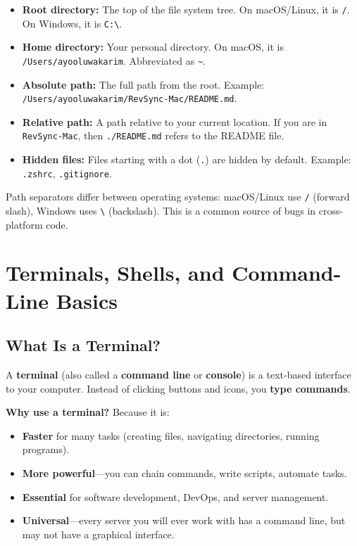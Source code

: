 \documentclass[12pt, a4paper, oneside]{book}
\begin{document}
\begin{itemize}[leftmargin=2em]
    \item \textbf{Root directory:} The top of the file system tree. On macOS/Linux, it is \texttt{/}. On Windows, it is \texttt{C:\textbackslash}.
    \item \textbf{Home directory:} Your personal directory. On macOS, it is \texttt{/Users/ayooluwakarim}. Abbreviated as \texttt{\textasciitilde}.
    \item \textbf{Absolute path:} The full path from the root. Example: \texttt{/Users/ayooluwakarim/RevSync-Mac/README.md}.
    \item \textbf{Relative path:} A path relative to your current location. If you are in \texttt{RevSync-Mac}, then \texttt{./README.md} refers to the README file.
    \item \textbf{Hidden files:} Files starting with a dot (\texttt{.}) are hidden by default. Example: \texttt{.zshrc}, \texttt{.gitignore}.
\end{itemize}

\begin{warningbox}
Path separators differ between operating systems: macOS/Linux use \texttt{/} (forward slash), Windows uses \texttt{\textbackslash} (backslash). This is a common source of bugs in cross-platform code.
\end{warningbox}

\section{Terminals, Shells, and Command-Line Basics}

\subsection{What Is a Terminal?}

A \textbf{terminal} (also called a \textbf{command line} or \textbf{console}) is a text-based interface to your computer. Instead of clicking buttons and icons, you \textbf{type commands}.

\textbf{Why use a terminal?} Because it is:
\begin{itemize}[leftmargin=2em]
    \item \textbf{Faster} for many tasks (creating files, navigating directories, running programs).
    \item \textbf{More powerful}---you can chain commands, write scripts, automate tasks.
    \item \textbf{Essential} for software development, DevOps, and server management.
    \item \textbf{Universal}---every server you will ever work with has a command line, but may not have a graphical interface.
\end{itemize}
\end{document}
